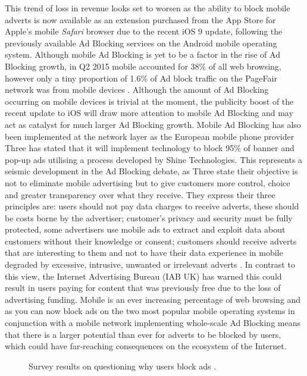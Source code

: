 \documentclass[12pt]{article}
\begin{document}
This trend of loss in revenue looks set to worsen as the ability to block mobile adverts is now available as an extension purchased from the App Store for Apple's mobile \textit{Safari} browser due to the recent iOS 9 update, following the previously available Ad Blocking services on the Android mobile operating system. Although mobile Ad Blocking is yet to be a factor in the rise of Ad Blocking growth, in Q2 2015 mobile accounted for 38\% of all web browsing, however only a tiny proportion of 1.6\% of Ad block traffic on the PageFair network was from mobile devices \parencite{adobeAdBlock}. Although the amount of Ad Blocking occurring on mobile devices is trivial at the moment, the publicity boost of the recent update to iOS will draw more attention to mobile Ad Blocking and may act as catalyst for  much larger Ad Blocking growth. Mobile Ad Blocking has also been implemented at the network layer as the European mobile phone provider Three has stated that it will implement technology to block 95\% of banner and pop-up ads utilising a process developed by Shine Technologies. This represents a seismic development in the Ad Blocking debate, as Three state their objective is not to eliminate mobile advertising but to give customers more control, choice and greater transparency over what they receive. They express their three principles are: users should not pay data charges to receive adverts, these should be costs borne by the advertiser; customer's privacy and security must be fully protected, some advertisers use mobile ads to extract and exploit data about customers without their knowledge or consent; customers should receive adverts that are interesting to them and not to have their data experience in mobile degraded by excessive, intrusive, unwanted or irrelevant adverts \parencite{threeAdBlock}. In contrast to this view, the Internet Advertising Bureau (IAB UK) has warned this could result in users paying for content that was previously free due to the loss of advertising funding. Mobile is an ever increasing percentage of web browsing and as you can now block ads on the two most popular mobile operating systems in conjunction with a  mobile network implementing whole-scale Ad Blocking means that there is a larger potential than ever for adverts to be blocked by users, which could have far-reaching consequences on the ecosystem of the Internet.  \\

\begin{figure} [H]
    \centering
        \caption{Survey results on questioning why users block ads \parencite{publishersWeb}.}
        \label{fig:adBlockingChart}
\end{figure}
\end{document}
